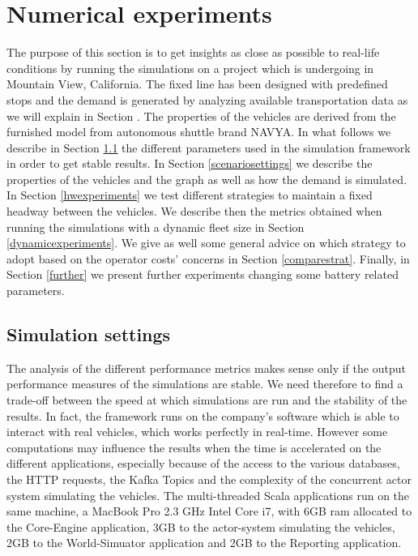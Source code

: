 \documentclass[12pt,a4paper]{article}
\begin{document}
\section{Numerical experiments}\label{experiments}
The purpose of this section is to get insights as close as possible to real-life conditions by running the simulations on a project which is undergoing in Mountain View, California. The fixed line has been designed with predefined stops and the demand is generated by analyzing available transportation data as we will explain in Section . The properties of the vehicles are derived from the furnished model from autonomous shuttle brand NAVYA. In what follows we describe in Section \ref{settings} the different parameters used in the simulation framework in order to get stable results. In Section \ref{scenariosettings} we describe the properties of the vehicles and the graph as well as how the demand is simulated. In Section \ref{hwexperiments} we test different strategies to maintain a fixed headway between the vehicles. We describe then the metrics obtained when running the simulations with a dynamic fleet size in Section \ref{dynamicexperiments}. We give as well some general advice on which strategy to adopt based on the operator costs' concerns in Section \ref{comparestrat}. Finally, in Section \ref{further} we present further experiments changing some battery related parameters.

\subsection{Simulation settings}\label{settings}
The analysis of the different performance metrics makes sense only if the output performance measures of the simulations are stable. We need therefore to find a trade-off between the speed at which simulations are run and the stability of the results. In fact, the framework runs on the company's software which is able to interact with real vehicles, which works perfectly in real-time. However some computations may influence the results when the time is accelerated on the different applications, especially because of the access to the various databases, the HTTP requests, the Kafka Topics and the complexity of the concurrent actor system simulating the vehicles. The multi-threaded Scala applications run on the same machine, a MacBook Pro 2.3 GHz Intel Core i7, with 6GB ram allocated to the Core-Engine application, 3GB to the actor-system simulating the vehicles, 2GB to the World-Simuator application and 2GB to the Reporting application. 
\end{document}
